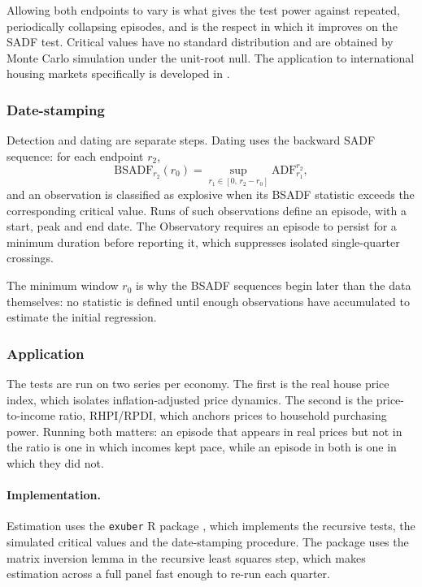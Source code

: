 Allowing both endpoints to vary is what gives the test power against
repeated, periodically collapsing episodes, and is the respect in which it
improves on the SADF test. Critical values have no standard distribution and
are obtained by Monte Carlo simulation under the unit-root null. The
application to international housing markets specifically is developed in
\citet{pavlidis2016}.

\subsubsection{Date-stamping}

Detection and dating are separate steps. Dating uses the backward SADF
sequence: for each endpoint $r_2$,
\begin{equation}
  \label{eq:bsadf}
  \mathrm{BSADF}_{r_2}(r_0)
    = \sup_{r_1 \in [0,\, r_2 - r_0]} \mathrm{ADF}_{r_1}^{r_2},
\end{equation}
and an observation is classified as explosive when its BSADF statistic
exceeds the corresponding critical value. Runs of such observations define an
episode, with a start, peak and end date. The Observatory requires an episode
to persist for a minimum duration before reporting it, which suppresses
isolated single-quarter crossings.

The minimum window $r_0$ is why the BSADF sequences begin later than the data
themselves: no statistic is defined until enough observations have
accumulated to estimate the initial regression.

\subsubsection{Application}

The tests are run on two series per economy. The first is the real house
price index, which isolates inflation-adjusted price dynamics. The second is
the price-to-income ratio, RHPI/RPDI, which anchors prices to household
purchasing power. Running both matters: an episode that appears in real
prices but not in the ratio is one in which incomes kept pace, while an
episode in both is one in which they did not.

\paragraph{Implementation.}
Estimation uses the \texttt{exuber} \textsf{R} package
\citep{vasilopoulos2022}, which implements the recursive tests, the
simulated critical values and the date-stamping procedure. The package uses
the matrix inversion lemma in the recursive least squares step, which makes
estimation across a full panel fast enough to re-run each quarter.

